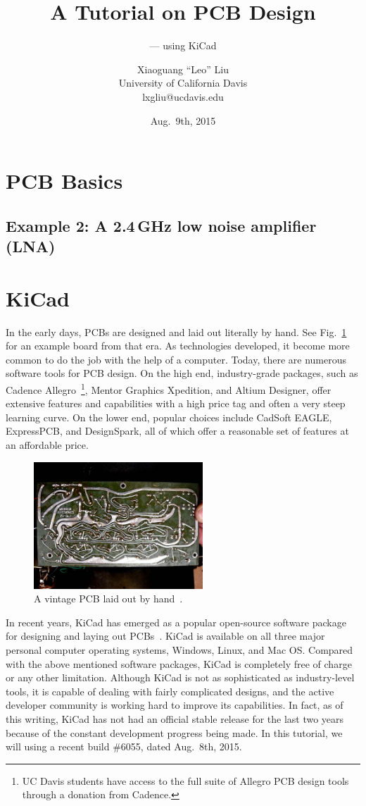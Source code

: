 \documentclass[12pt,letterpaper]{scrartcl}
\title{A Tutorial on PCB Design}
\subtitle{--- using KiCad}
\author{Xiaoguang ``Leo'' Liu \\University of California Davis \\ lxgliu@ucdavis.edu}
\date{Aug.~9th, 2015}
\begin{document}
\maketitle

\tableofcontents

\newpage
\section{PCB Basics}

\subsection{Example 2: A 2.4\,GHz low noise amplifier (LNA)}

\newpage
\section{KiCad}
In the early days, PCBs are designed and laid out literally by hand. See Fig.~\ref{fig:hand-pcb} for an example board from that era. As technologies developed, it become more common to do the job with the help of a computer. Today, there are numerous software tools for PCB design. On the high end, industry-grade packages, such as Cadence Allegro~\footnote{UC Davis students have access to the full suite of Allegro PCB design tools through a donation from Cadence.}, Mentor Graphics Xpedition, and Altium Designer, offer extensive features and capabilities with a high price tag and often a very steep learning curve. On the lower end, popular choices include CadSoft EAGLE, ExpressPCB, and DesignSpark, all of which offer a reasonable set of features at an affordable price. 

\begin{figure}[ht]
\centering
\includegraphics[width=2.5in]{hand-pcb.jpg}
\caption{A vintage PCB laid out by hand~\cite{hand-pcb}.}
\label{fig:hand-pcb}
\end{figure}

In recent years, KiCad has emerged as a popular open-source software package for designing and laying out PCBs~\cite{kicad}. KiCad is available on all three major personal computer operating systems, Windows, Linux, and Mac OS. 
Compared with the above mentioned software packages, KiCad is completely free of charge or any other limitation. Although KiCad is not as sophisticated as industry-level tools, it is capable of dealing with fairly complicated designs, and the active developer community is working hard to improve its capabilities. In fact, as of this writing, KiCad has not had an official stable release for the last two years because of the constant development progress being made. In this tutorial, we will using a recent build \#6055, dated Aug.~8th, 2015.
\end{document}
